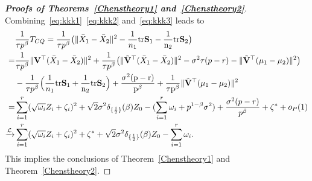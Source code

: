 \documentclass[times,sort&compress,3p]{elsarticle}
\newcommand{\mytr}{\rm tr}
\theoremstyle{plain}
\theoremstyle{definition}
\theoremstyle{remark}
\begin{document}
\begin{appendices}
\begin{proof}[\textbf{Proofs of Theorems~\ref{Chenstheory1} and~\ref{Chenstheory2}}]
    Combining~\eqref{eq:kkk1}~\eqref{eq:kkk2} and~\eqref{eq:kkk3} leads to
    $$
    \begin{aligned}
        &\frac{1}{\tau p^{\beta}} T_{CQ}
        =\frac{1}{\tau p^{\beta}}\big(\|\bar{X}_1-\bar{X}_2\|^2-\frac{1}{n_1}\mytr \BS_1-\frac{1}{n_2}\mytr \BS_2\big)\\
        =&
        \frac{1}{\tau p^{\beta}}{\|\BV^\top (\bar{X}_1-\bar{X}_2)\|^2}+
        \frac{1}{\tau p^{\beta}} \big({\|\tilde{\BV}^\top (\bar{X}_1-\bar{X}_2)\|^2-\sigma^2 \tau(p-r)-\|\tilde{\BV}^\top (\mu_1-\mu_2)\|^2}\big)\\
        &-\frac{1}{\tau p^{\beta}}\Big(\frac{1}{n_1}\mytr \BS_1+\frac{1}{n_2}\mytr \BS_2\Big)+\frac{\sigma^2 (p-r)}{p^\beta}+\frac{1}{\tau p^\beta}\|\tilde{\BV}^\top (\mu_1-\mu_2)\|^2\\
        =&
        \sum_{i=1}^r (\sqrt{\omega_i} Z_i+\zeta_i)^2+
   \sqrt{2} \sigma^2 \delta_{\{\frac{1}{2}\}}(\beta)Z_0
        -
        (\sum_{i=1}^r \omega_i+p^{1-\beta}\sigma^2)
        +\frac{\sigma^2 (p-r)}{p^\beta}+\zeta^*+o_P(1)\\
        \xrightarrow{\mathcal{L}}&
        \sum_{i=1}^r (\sqrt{\omega_i} Z_i+\zeta_i)^2+
\zeta^*+
    \sqrt{2}\sigma^2 \delta_{\{\frac{1}{2}\}}(\beta)Z_0
        -
        \sum_{i=1}^r \omega_i.
    \end{aligned}
    $$
    This implies the conclusions of Theorem~\ref{Chenstheory1} and Theorem~\ref{Chenstheory2}.

%

\end{proof}


\end{appendices}
\end{document}
